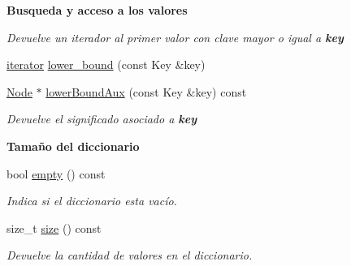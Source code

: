 \begin{Indent}{\bf Busqueda y acceso a los valores}
\begin{DoxyCompactItemize}
\begin{DoxyCompactList}\small\item\em Devuelve un iterador al primer valor con clave mayor o igual a {\bfseries key} \end{DoxyCompactList}\item 
\hyperlink{classaed2_1_1map_1_1iterator}{iterator} \hyperlink{classaed2_1_1map_a07b3dd65557c59ee085e5f211269c6b3_a07b3dd65557c59ee085e5f211269c6b3}{lower\+\_\+bound} (const Key \&key)
\item 
\hyperlink{structaed2_1_1map_1_1Node}{Node} $\ast$ \hyperlink{classaed2_1_1map_a7690a8432874bad5f6cab403c1804bba_a7690a8432874bad5f6cab403c1804bba}{lower\+Bound\+Aux} (const Key \&key) const 
\begin{DoxyCompactList}\small\item\em Devuelve el significado asociado a {\bfseries key} \end{DoxyCompactList}\end{DoxyCompactItemize}
\end{Indent}
\begin{Indent}{\bf Tamaño del diccionario}\par
\begin{DoxyCompactItemize}
\item 
bool \hyperlink{classaed2_1_1map_af5320ca0a7df4d16015441d5d055a7ee_af5320ca0a7df4d16015441d5d055a7ee}{empty} () const 
\begin{DoxyCompactList}\small\item\em Indica si el diccionario esta vacío. \end{DoxyCompactList}\item 
size\+\_\+t \hyperlink{classaed2_1_1map_a89f2613f926ac13293eafe65889d6021_a89f2613f926ac13293eafe65889d6021}{size} () const 
\begin{DoxyCompactList}\small\item\em Devuelve la cantidad de valores en el diccionario. \end{DoxyCompactList}\end{DoxyCompactItemize}
\end{Indent}
